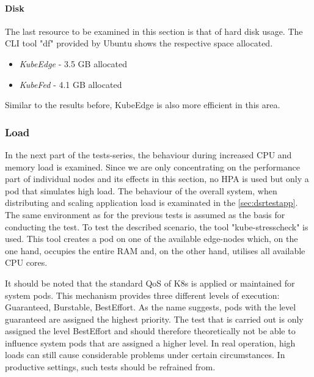 \documentclass[MIC,Master,english]{twbook}%
\begin{document}
\paragraph{Disk} The last resource to be examined in this section is that of hard disk usage. The CLI tool "df" provided by Ubuntu shows the respective space allocated.

\begin{itemize}
    \itemsep0em 
    \item \textit{KubeEdge} - 3.5 GB allocated
    \item \textit{KubeFed} - 4.1 GB allocated
\end{itemize}
Similar to the results before, KubeEdge is also more efficient in this area.

\subsubsection{Load} In the next part of the tests-series, the behaviour during increased CPU and memory load is examined. Since we are only concentrating on the performance part of individual nodes and its effects in this section, no \ac{HPA} is used but only a pod that simulates high load. The behaviour of the overall system, when distributing and scaling application load is examinated in the \autoref{sec:dsrtestapp}. The same environment as for the previous tests is assumed as the basis for conducting the test. To test the described scenario, the tool "kube-stresscheck"\cite{kube-stress} is used. This tool creates a pod on one of the available edge-nodes which, on the one hand, occupies the entire \ac{RAM} and, on the other hand, utilises all available CPU cores.

It should be noted that the standard \ac{QoS} of \ac{K8s} is applied or maintained for system pods\cite{k8s-qos}. This mechanism provides three different levels of execution: Guaranteed, Burstable, BestEffort. As the name suggests, pods with the level guaranteed are assigned the highest priority. The test that is carried out is only assigned the level BestEffort and should therefore theoretically not be able to influence system pods that are assigned a higher level. In real operation, high loads can still cause considerable problems under certain circumstances. In productive settings, such tests should be refrained from.
\end{document}
